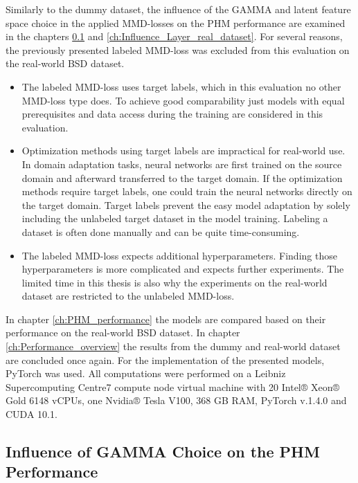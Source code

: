 Similarly to the dummy dataset, the influence of the GAMMA and latent feature space choice in the applied MMD-losses on the PHM performance are examined in the chapters \ref{ch:Influence_GAMMA_real_dataset} and \ref{ch:Influence_Layer_real_dataset}. For several reasons, the previously presented labeled MMD-loss was excluded from this evaluation on the real-world BSD dataset. 
\begin{itemize}
    \item The labeled MMD-loss uses target labels, which in this evaluation no other MMD-loss type does. To achieve good comparability just models with equal prerequisites and data access during the training are considered in this evaluation.
    \item Optimization methods using target labels are impractical for real-world use. In domain adaptation tasks, neural networks are first trained on the source domain and afterward transferred to the target domain. If the optimization methods require target labels, one could train the neural networks directly on the target domain. Target labels prevent the easy model adaptation by solely including the unlabeled target dataset in the model training. Labeling a dataset is often done manually and can be quite time-consuming.
    \item The labeled MMD-loss expects additional hyperparameters. Finding those hyperparameters is more complicated and expects further experiments. The limited time in this thesis is also why the experiments on the real-world dataset are restricted to the unlabeled MMD-loss. 
\end{itemize}

In chapter \ref{ch:PHM_performance} the models are compared based on their performance on the real-world BSD dataset. In chapter \ref{ch:Performance_overview} the results from the dummy and real-world dataset are concluded once again. For the implementation of the presented models, PyTorch was used. All computations were performed on a Leibniz Supercomputing Centre7 compute node virtual machine with 20 Intel® Xeon® Gold 6148 vCPUs, one Nvidia® Tesla V100, 368 GB RAM, PyTorch v.1.4.0 and CUDA 10.1.


\subsection{Influence of GAMMA Choice on the PHM Performance}\label{ch:Influence_GAMMA_real_dataset}

